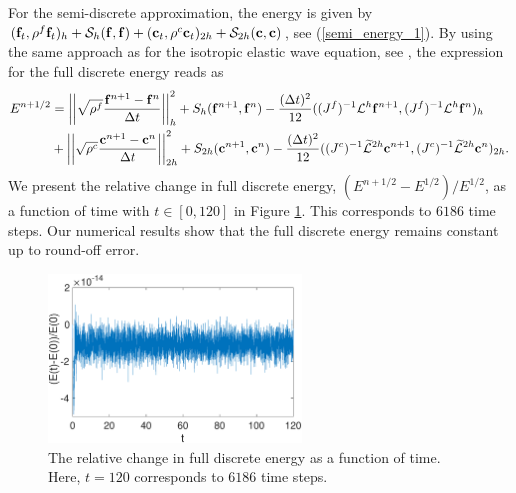 For the semi-discrete approximation, the energy is given by $({\bf f}_t,{\rho}^f{\bf f}_t)_h + \mathcal{S}_h({\bf f},{\bf f}) + ({\bf c}_t,{\rho}^{c}{\bf c}_t)_{2h} + \mathcal{S}_{2h}({\bf c},{\bf c})$, see (\ref{semi_energy_1}). By using the same approach as for the isotropic elastic wave equation, see \cite{petersson2015wave,sjogreen2012fourth},  the expression for the full discrete energy reads as
\begin{align*}
E^{n+1/2} &= \left|\left|\sqrt{{\rho}^f}\frac{{\bf f}^{n+1}-{\bf f}^n}{\Delta t}\right|\right|_h^2 + S_h({\bf f}^{n+1},{\bf f}^n) - \frac{(\Delta t)^2}{12}((J^f)^{-1}\mathcal{L}^h{\bf f}^{n+1},(J^f)^{-1}\mathcal{L}^h{\bf f}^n)_h\\
&+ \left|\left|\sqrt{{\rho}^{c}}\frac{{\bf c}^{n+1}-{\bf c}^n}{\Delta t}\right|\right|_{2h}^2 + S_{2h}({\bf c}^{n+1},{\bf c}^n) - \frac{(\Delta t)^2}{12}((J^c)^{-1}\widetilde{\mathcal{L}}^{2h}{\bf c}^{n+1},(J^c)^{-1}\widetilde{\mathcal{L}}^{2h}{\bf c}^n)_{2h}.
\end{align*}
We present the relative change in full discrete energy, $(E^{n+1/2}-E^{1/2})/E^{1/2}$, as a function of time with $t\in[0,120]$ in Figure \ref{discrete_energy}. This corresponds to $6186$ time steps. Our numerical results show that the full discrete energy remains constant up to round-off error.
\begin{figure}[htbp]
	\centering
	\includegraphics[width=0.6\textwidth,trim={0cm 0cm 0cm 0cm}, clip]{discrete_energy.eps}
	\caption{The relative change in full discrete energy as a function of time. Here, $t = 120$ corresponds to $6186$ time steps.}\label{discrete_energy}
\end{figure}


